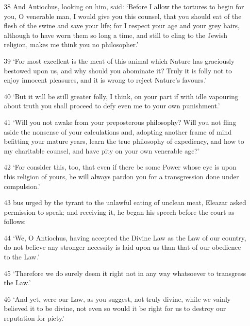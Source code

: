 \par 38 And Antiochus, looking on him, said: ‘Before I allow the tortures to begin for you, O venerable man, I would give you this counsel, that you should eat of the flesh of the swine and save your life; for I respect your age and your grey hairs, although to have worn them so long a time, and still to cling to the Jewish religion, makes me think you no philosopher.’

\par 39 ‘For most excellent is the meat of this animal which Nature has graciously bestowed upon us, and why should you abominate it? Truly it is folly not to enjoy innocent pleasures, and it is wrong to reject Nature's favours.’

\par 40 ‘But it will be still greater folly, I think, on your part if with idle vapouring about truth you shall proceed to defy even me to your own punishment.’

\par 41 ‘Will you not awake from your preposterous philosophy? Will you not fling aside the nonsense of your calculations and, adopting another frame of mind befitting your mature years, learn the true philosophy of expediency, and how to my charitable counsel, and have pity on your own venerable age?’

\par 42 ‘For consider this, too, that even if there be some Power whose eye is upon this religion of yours, he will always pardon you for a transgression done under compulsion.’

\par 43 bus urged by the tyrant to the unlawful eating of unclean meat, Eleazar asked permission to speak; and receiving it, he began his speech before the court as follows:

\par 44 ‘We, O Antiochus, having accepted the Divine Law as the Law of our country, do not believe any stronger necessity is laid upon us than that of our obedience to the Law.’

\par 45 ‘Therefore we do surely deem it right not in any way whatsoever to transgress the Law.’

\par 46 ‘And yet, were our Law, as you suggest, not truly divine, while we vainly believed it to be divine, not even so would it be right for us to destroy our reputation for piety.’

